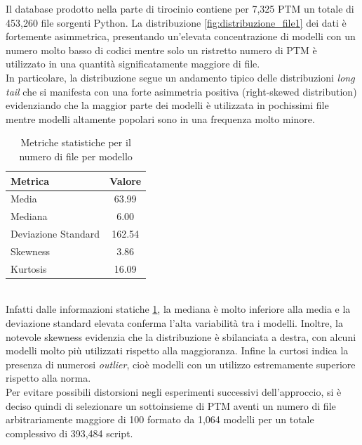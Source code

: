\documentclass{article}
\begin{document}
Il database prodotto nella parte di tirocinio contiene per 7,325 PTM un totale di 453,260 file sorgenti Python. La distribuzione \ref{fig:distribuzione_file1} dei dati è fortemente asimmetrica, presentando un'elevata concentrazione di modelli con un numero molto basso di codici mentre solo un ristretto numero di PTM è utilizzato in una quantità significatamente maggiore di file.\\
In particolare, la distribuzione segue un andamento tipico delle distribuzioni \textit{long tail} che si manifesta con una forte asimmetria positiva (right-skewed distribution) evidenziando che la maggior parte dei modelli è utilizzata in pochissimi file mentre modelli altamente popolari sono in una frequenza molto minore.\\
\begin{table}[h]
    \centering
    \begin{tabular}{|l|c|}
        \hline
        \textbf{Metrica} & \textbf{Valore} \\
        \hline
        Media & 63.99 \\
        Mediana & 6.00 \\
        Deviazione Standard & 162.54 \\
        Skewness & 3.86 \\
        Kurtosis & 16.09 \\
        \hline
    \end{tabular}
    \caption{Metriche statistiche per il numero di file per modello}
    \label{tab:metriche_file_modello1}
\end{table}\\
Infatti dalle informazioni statiche \ref{tab:metriche_file_modello1}, la mediana è molto inferiore alla media e la deviazione standard elevata conferma l'alta variabilità tra i modelli. Inoltre, la notevole skewness evidenzia che la distribuzione è sbilanciata a destra, con alcuni modelli molto più utilizzati rispetto alla maggioranza. Infine la curtosi indica la presenza di numerosi \textit{outlier}, cioè modelli con un utilizzo estremamente superiore rispetto alla norma.\\
Per evitare possibili distorsioni negli esperimenti successivi dell'approccio, si è deciso quindi di selezionare un sottoinsieme di PTM aventi un numero di file arbitrariamente maggiore di 100 formato da 1,064 modelli per un totale complessivo di 393,484 script.\\
\end{document}
